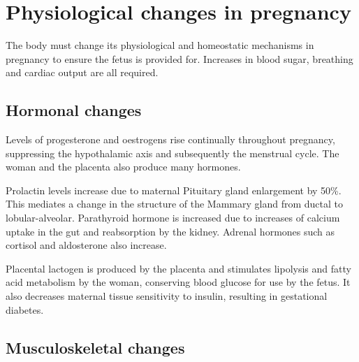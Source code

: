 \documentclass[12pt,a4paper,onecolumn]{article}
\begin{document}
\begin{center}
%
%
%
\end{center}

\begin{center}
%
%
%
\end{center}



\section{Physiological changes in pregnancy}

The body must change its physiological and homeostatic mechanisms in pregnancy to ensure the fetus
is provided for. Increases in blood sugar, breathing and cardiac output are all required.

\subsection{Hormonal changes}

Levels of progesterone and oestrogens rise continually throughout pregnancy, suppressing the
hypothalamic axis and subsequently the menstrual cycle. The woman and the placenta also produce many
hormones.

Prolactin levels increase due to maternal Pituitary gland enlargement by 50\%. This mediates a
change in the structure of the Mammary gland from ductal to lobular-alveolar. Parathyroid hormone is
increased due to increases of calcium uptake in the gut and reabsorption by the kidney. Adrenal
hormones such as cortisol and aldosterone also increase.

Placental lactogen is produced by the placenta and stimulates lipolysis and fatty acid metabolism by
the woman, conserving blood glucose for use by the fetus. It also decreases maternal tissue
sensitivity to insulin, resulting in gestational diabetes.

\subsection{Musculoskeletal changes}
\end{document}
